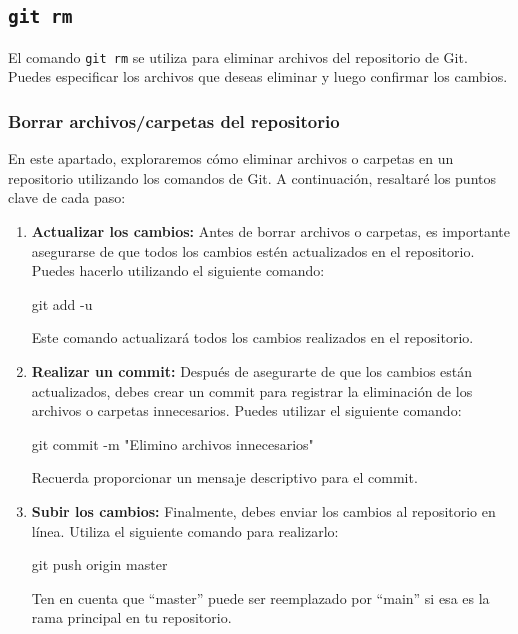 \documentclass[
  a4paper,
]{article}
\newenvironment{Shaded}{}{}
\newcommand{\AttributeTok}[1]{\textcolor[rgb]{0.84,0.23,0.29}{#1}}
\newcommand{\FunctionTok}[1]{\textcolor[rgb]{0.44,0.26,0.76}{#1}}
\newcommand{\NormalTok}[1]{\textcolor[rgb]{0.14,0.16,0.18}{#1}}
\newcommand{\StringTok}[1]{\textcolor[rgb]{0.01,0.18,0.38}{#1}}
\begin{document}
\subsection{\texorpdfstring{\texttt{git\ rm}}{git rm}}\label{git-rm}

El comando \texttt{git\ rm} se utiliza para eliminar archivos del
repositorio de Git. Puedes especificar los archivos que deseas eliminar
y luego confirmar los cambios.

\subsubsection{Borrar archivos/carpetas del
repositorio}\label{borrar-archivoscarpetas-del-repositorio}

En este apartado, exploraremos cómo eliminar archivos o carpetas en un
repositorio utilizando los comandos de Git. A continuación, resaltaré
los puntos clave de cada paso:

\begin{enumerate}
\def\labelenumi{\arabic{enumi}.}
\item
  \textbf{Actualizar los cambios:} Antes de borrar archivos o carpetas,
  es importante asegurarse de que todos los cambios estén actualizados
  en el repositorio. Puedes hacerlo utilizando el siguiente comando:

\begin{Shaded}
\begin{Highlighting}[]
\FunctionTok{git}\NormalTok{ add }\AttributeTok{{-}u}
\end{Highlighting}
\end{Shaded}

  Este comando actualizará todos los cambios realizados en el
  repositorio.
\item
  \textbf{Realizar un commit:} Después de asegurarte de que los cambios
  están actualizados, debes crear un commit para registrar la
  eliminación de los archivos o carpetas innecesarios. Puedes utilizar
  el siguiente comando:

\begin{Shaded}
\begin{Highlighting}[]
\FunctionTok{git}\NormalTok{ commit }\AttributeTok{{-}m} \StringTok{"Elimino archivos innecesarios"}
\end{Highlighting}
\end{Shaded}

  Recuerda proporcionar un mensaje descriptivo para el commit.
\item
  \textbf{Subir los cambios:} Finalmente, debes enviar los cambios al
  repositorio en línea. Utiliza el siguiente comando para realizarlo:

\begin{Shaded}
\begin{Highlighting}[]
\FunctionTok{git}\NormalTok{ push origin master}
\end{Highlighting}
\end{Shaded}

  Ten en cuenta que ``master'' puede ser reemplazado por ``main'' si esa
  es la rama principal en tu repositorio.
\end{enumerate}
\end{document}
